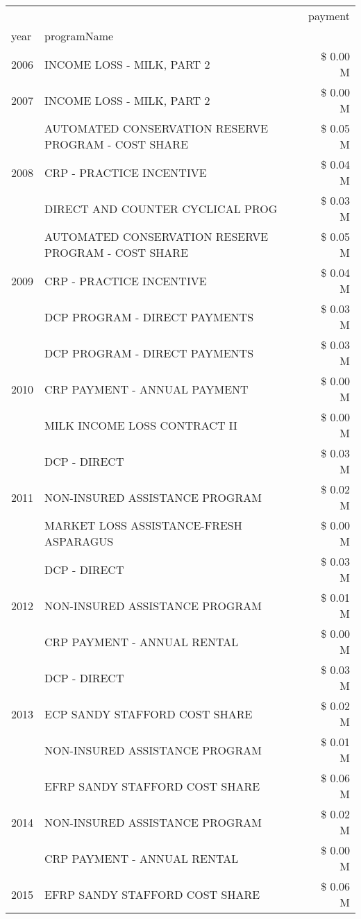 \begin{tabular}{llr}
\toprule
 &  & payment \\
year & programName &  \\
\midrule
2006 & INCOME LOSS - MILK, PART 2 & \$ 0.00 M \\
\cline{1-3}
2007 & INCOME LOSS - MILK, PART 2 & \$ 0.00 M \\
\cline{1-3}
\multirow[t]{3}{*}{2008} & AUTOMATED CONSERVATION RESERVE PROGRAM - COST SHARE & \$ 0.05 M \\
 & CRP - PRACTICE INCENTIVE & \$ 0.04 M \\
 & DIRECT AND COUNTER CYCLICAL PROG & \$ 0.03 M \\
\cline{1-3}
\multirow[t]{3}{*}{2009} & AUTOMATED CONSERVATION RESERVE PROGRAM - COST SHARE & \$ 0.05 M \\
 & CRP - PRACTICE INCENTIVE & \$ 0.04 M \\
 & DCP PROGRAM - DIRECT PAYMENTS & \$ 0.03 M \\
\cline{1-3}
\multirow[t]{3}{*}{2010} & DCP PROGRAM - DIRECT PAYMENTS & \$ 0.03 M \\
 & CRP PAYMENT - ANNUAL PAYMENT & \$ 0.00 M \\
 & MILK INCOME LOSS CONTRACT II & \$ 0.00 M \\
\cline{1-3}
\multirow[t]{3}{*}{2011} & DCP - DIRECT & \$ 0.03 M \\
 & NON-INSURED ASSISTANCE PROGRAM & \$ 0.02 M \\
 & MARKET LOSS ASSISTANCE-FRESH ASPARAGUS & \$ 0.00 M \\
\cline{1-3}
\multirow[t]{3}{*}{2012} & DCP - DIRECT & \$ 0.03 M \\
 & NON-INSURED ASSISTANCE PROGRAM & \$ 0.01 M \\
 & CRP PAYMENT - ANNUAL RENTAL & \$ 0.00 M \\
\cline{1-3}
\multirow[t]{3}{*}{2013} & DCP - DIRECT & \$ 0.03 M \\
 & ECP SANDY STAFFORD COST SHARE & \$ 0.02 M \\
 & NON-INSURED ASSISTANCE PROGRAM & \$ 0.01 M \\
\cline{1-3}
\multirow[t]{3}{*}{2014} & EFRP SANDY STAFFORD COST SHARE & \$ 0.06 M \\
 & NON-INSURED ASSISTANCE PROGRAM & \$ 0.02 M \\
 & CRP PAYMENT - ANNUAL RENTAL & \$ 0.00 M \\
\cline{1-3}
\multirow[t]{3}{*}{2015} & EFRP SANDY STAFFORD COST SHARE & \$ 0.06 M \\

\end{tabular}
